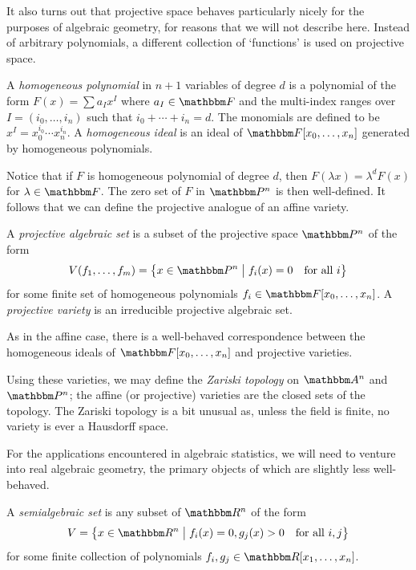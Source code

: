 \documentclass[11pt,titlepage]{article}
\newcommand*{\vbar}{\;\big\vert\;}
\numberwithin{equation}{section}
\begin{document}
    It also turns out that projective space behaves particularly nicely for the
    purposes of algebraic geometry, for reasons that we will not describe here.
    Instead of arbitrary polynomials, a different collection of `functions' is
    used on projective space.
    \begin{definition}
        A \emph{homogeneous polynomial} in $n+1$ variables of degree $d$ is a
        polynomial of the form $F(x) = \sum a_I x^I$ where $a_I \in \F$ and the
        multi-index ranges over $I = (i_0, \ldots, i_n)$ such that $i_0 + \cdots
        + i_n = d$.  The monomials are defined to be $x^I = x_0^{i_0}\cdots
        x_n^{i_n}$.  A \emph{homogeneous ideal} is an ideal of $\F[x_0, \ldots,
        x_n]$ generated by homogeneous polynomials.
    \end{definition}
    Notice that if $F$ is homogeneous polynomial of degree $d$, then $F(\lambda
    x) = \lambda^d F(x)$ for $\lambda \in \F$.  The zero set of $F$ in $\Proj^n$
    is then well-defined.  It follows that we can define the projective analogue
    of an affine variety.
    \begin{definition}
        A \emph{projective algebraic set} is a subset of the projective space
        $\Proj^n$ of the form
        \[
            V(f_1, \ldots, f_m)
            = \cdil[\big]{x \in \Proj^n \vbar f_i(x) = 0 \quad\text{for all $i$}}
        \]
        for some finite set of homogeneous polynomials $f_i \in \F[x_0,
        \ldots,x_n]$.  A \emph{projective variety} is an irreducible projective
        algebraic set.
    \end{definition}
    As in the affine case, there is a well-behaved correspondence between the
    homogeneous ideals of $\F[x_0, \ldots, x_n]$ and projective varieties.

    Using these varieties, we may define the \emph{Zariski topology} on $\A^n$
    and $\Proj^n$;  the affine (or projective) varieties are the closed sets of
    the topology.  The Zariski topology is a bit unusual as, unless the field is
    finite, no variety is ever a Hausdorff space.

    For the applications encountered in algebraic statistics, we will need to
    venture into real algebraic geometry, the primary objects of which are
    slightly less well-behaved.
    \begin{definition}
        A \emph{semialgebraic set} is any subset of $\R^n$ of the form
        \[
            V = \cdil[\big]{ x \in \R^n \vbar
                f_i(x) = 0, g_j(x) > 0
            \quad\text{for all $i,j$}}
        \]
        for some finite collection of polynomials $f_i, g_j \in \R[x_1, \ldots,
        x_n]$.
    \end{definition}
\end{document}
